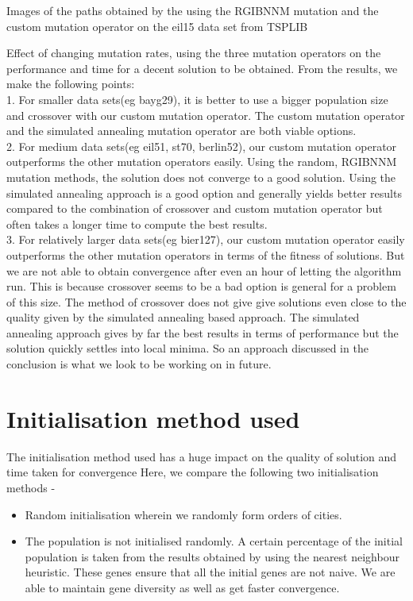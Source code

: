 \documentclass{article}
\begin{document}
Images of the paths obtained by the using the RGIBNNM mutation and the custom mutation operator on the eil15 data set from TSPLIB

\vspace{5mm}
Effect of changing mutation rates, using the three mutation operators on the performance and time for a decent solution to be obtained.
From the results, we make the following points:
\\1.  For smaller data sets(eg bayg29), it is better to use a bigger population size and crossover with our custom mutation operator. The custom mutation operator and the simulated annealing mutation operator are both viable options. 
\\2.  For medium data sets(eg eil51, st70, berlin52), our custom mutation operator outperforms the other mutation operators easily. Using the random, RGIBNNM mutation methods, the solution does not converge to a good solution. Using the simulated annealing approach is a good option and generally yields better results compared to the combination of crossover and custom mutation operator but often takes a longer time to compute the best results. 
\\3.  For relatively larger data sets(eg bier127), our custom mutation operator easily outperforms the other mutation operators in terms of the fitness of solutions. But we are not able to obtain convergence after even an hour of letting the algorithm run. This is because crossover seems to be a bad option is general for a problem of this size. The method of crossover does not give give solutions even close to the quality given by the simulated annealing based approach. The simulated annealing approach gives by far the best results in terms of performance but the solution quickly settles into local minima. So an approach discussed in the conclusion is what we look to be working on in future.

\section{Initialisation method used}
The initialisation method used has a huge impact on the quality of solution and time taken for convergence
Here, we compare the following two initialisation methods - 
\begin{itemize} 
  \item Random initialisation wherein we randomly form orders of cities. 
  \item The population is not initialised randomly. A certain percentage of the initial population is taken from the results obtained by using the nearest neighbour heuristic. These genes ensure that all the initial genes are not naive. We are able to maintain gene diversity as well as get faster convergence.
\end{itemize}
\end{document}
